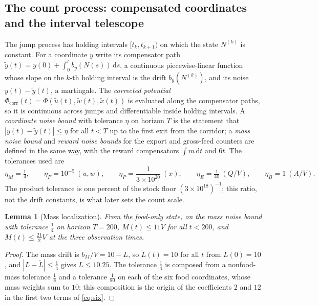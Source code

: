 \documentclass[11pt,letterpaper]{article}
\theoremstyle{plain}
\newtheorem{lemma}[theorem]{Lemma}
\theoremstyle{definition}
\theoremstyle{remark}
\numberwithin{equation}{section}
\newcommand{\dd}{\,\mathrm d}
\newcommand{\floorstock}{(3\times10^{18})^{-1}}
\newcommand{\corr}{\mathrm{corr}}
\begin{document}
\subsection{The count process: compensated coordinates and the interval telescope}\label{sec:count}
The jump process has holding intervals $[t_k,t_{k+1})$ on which the state $N^{(k)}$ is constant. For a coordinate $y$ write its compensator path $\tilde y(t)=y(0)+\int_0^tb_y(N(s))\dd s$, a continuous piecewise-linear function whose slope on the $k$-th holding interval is the drift $b_y(N^{(k)})$, and its noise $y(t)-\tilde y(t)$, a martingale. The \emph{corrected potential} $\Phi_\corr(t)=\Phi(\tilde u(t),\tilde w(t),\tilde x(t))$ is evaluated along the compensator paths, so it is continuous across jumps and differentiable inside holding intervals. A \emph{coordinate noise bound} with tolerance $\eta$ on horizon $T$ is the statement that $|y(t)-\tilde y(t)|\le\eta$ for all $t<T$ up to the first exit from the corridor; a \emph{mass noise bound} and \emph{reward noise bounds} for the export and gross-feed counters are defined in the same way, with the reward compensators $\int m\dd t$ and $6t$. The tolerances used are
\begin{equation}\label{eq:tolerances}
 \eta_M=\tfrac14,\qquad \eta_F=10^{-5}\ (u,w),\qquad \eta_P=\frac1{3\times10^{20}}\ (x),\qquad \eta_E=\tfrac1{40}\ (Q/V),\qquad \eta_B=1\ (A/V).
\end{equation}
The product tolerance is one percent of the stock floor $\floorstock$; this ratio, not the drift constants, is what later sets the count scale.

\begin{lemma}[Mass localization]\label{lem:mass}
From the food-only state, on the mass noise bound with tolerance $\tfrac14$ on horizon $T=200$, $M(t)\le11V$ for all $t<200$, and $M(t)\le\tfrac{21}2V$ at the three observation times.
\end{lemma}
\begin{proof}
The mass drift is $b_M/V=10-L$, so $\tilde L(t)=10$ for all $t$ from $L(0)=10$, and $|L-\tilde L|\le\tfrac14$ gives $L\le10.25$. The tolerance $\tfrac14$ is composed from a nonfood-mass tolerance $\tfrac18$ and a tolerance $\tfrac1{80}$ on each of the six food coordinates, whose mass weights sum to $10$; this composition is the origin of the coefficients $2$ and $12$ in the first two terms of \eqref{eq:six}.
\end{proof}
\end{document}
